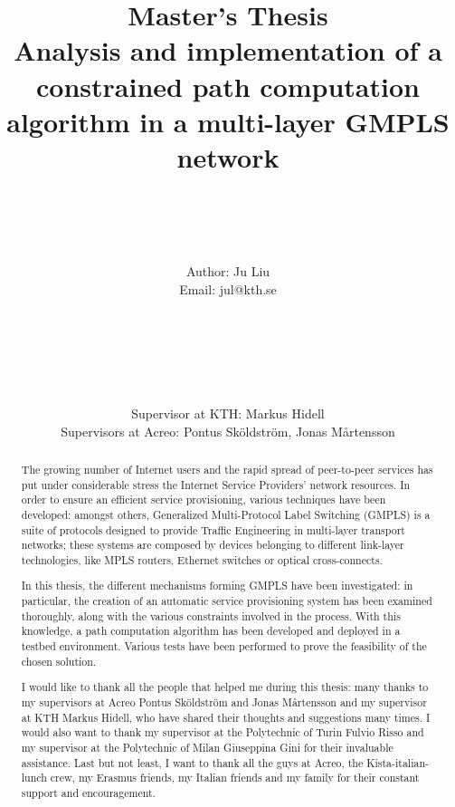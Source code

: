 \documentclass[10pt,a4paper]{report}
\author{\\\\\\\\Author: \Large{Ju Liu} \\ Email: jul@kth.se \\\\\\\\\\\\\\
  Supervisor at KTH: Markus Hidell \\ Supervisors at Acreo: Pontus Sköldström, Jonas
  Mårtensson }
\title{Master's Thesis
  \\ \textbf{Analysis and implementation of a constrained path
    computation algorithm in a multi-layer GMPLS network}}
\begin{document}
\date{}
\maketitle

\thispagestyle{empty}
\begin{abstract}
  The growing number of Internet users and the rapid spread of
  peer-to-peer services has put under considerable stress the Internet
  Service Providers' network resources. In order to ensure an
  efficient service provisioning, various techniques have been
  developed: amongst others, Generalized Multi-Protocol Label
  Switching (GMPLS) is a suite of protocols designed to provide
  Traffic Engineering in multi-layer transport networks; these systems
  are composed by devices belonging to different link-layer
  technologies, like MPLS routers, Ethernet switches or optical
  cross-connects.

  In this thesis, the different mechanisms forming GMPLS have been
  investigated: in particular, the creation of an automatic service
  provisioning system has been examined thoroughly, along with the
  various constraints involved in the process. With this knowledge, a
  path computation algorithm has been developed and deployed in a
  testbed environment. Various tests have been performed to prove the
  feasibility of the chosen solution.
\end{abstract}

\newpage
\def\abstractname{Acknowledgments}
\begin{abstract}\thispagestyle{empty}
  I would like to thank all the people that helped me during this
  thesis: many thanks to my supervisors at Acreo Pontus Sköldström and
  Jonas Mårtensson and my supervisor at KTH Markus Hidell, who have
  shared their thoughts and suggestions many times. I would also want
  to thank my supervisor at the Polytechnic of Turin Fulvio Risso and
  my supervisor at the Polytechnic of Milan Giuseppina Gini for their
  invaluable assistance. Last but not least, I want to thank all the
  guys at Acreo, the Kista-italian-lunch crew, my Erasmus friends, my
  Italian friends and my family for their constant support and
  encouragement.
\end{abstract}

\newpage
{}
\setcounter{page}{3}
\large
\tableofcontents
\newpage
\normalsize
\listoffigures
{} 
\newpage
\listoftables
{} 
\end{document}
